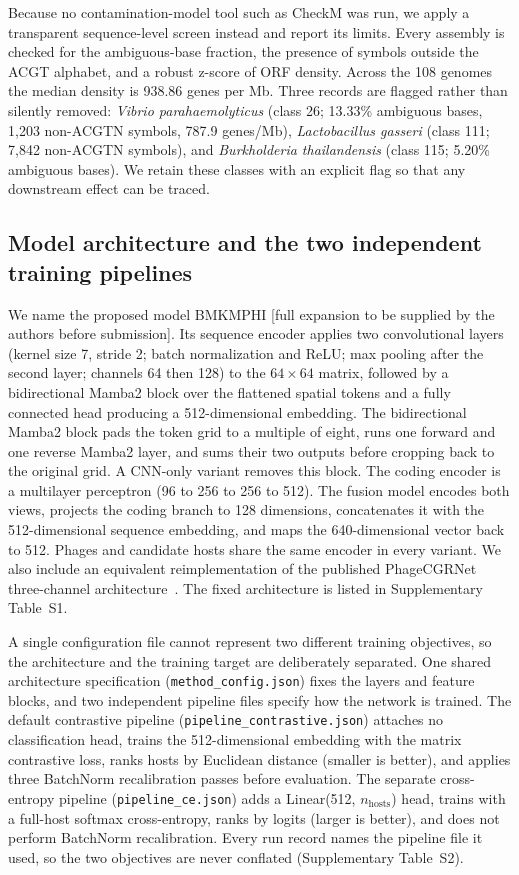 \documentclass[utf8]{FrontiersinVancouver}
\begin{document}
Because no contamination-model tool such as CheckM was run, we apply a transparent sequence-level screen instead and report its limits. Every assembly is checked for the ambiguous-base fraction, the presence of symbols outside the ACGT alphabet, and a robust z-score of ORF density. Across the 108 genomes the median density is 938.86 genes per Mb. Three records are flagged rather than silently removed: \textit{Vibrio parahaemolyticus} (class 26; 13.33\% ambiguous bases, 1,203 non-ACGTN symbols, 787.9 genes/Mb), \textit{Lactobacillus gasseri} (class 111; 7,842 non-ACGTN symbols), and \textit{Burkholderia thailandensis} (class 115; 5.20\% ambiguous bases). We retain these classes with an explicit flag so that any downstream effect can be traced.

\subsection{Model architecture and the two independent training pipelines}

We name the proposed model BMKMPHI [full expansion to be supplied by the authors before submission]. Its sequence encoder applies two convolutional layers (kernel size 7, stride 2; batch normalization and ReLU; max pooling after the second layer; channels 64 then 128) to the $64\times64$ matrix, followed by a bidirectional Mamba2 block over the flattened spatial tokens and a fully connected head producing a 512-dimensional embedding. The bidirectional Mamba2 block pads the token grid to a multiple of eight, runs one forward and one reverse Mamba2 layer, and sums their two outputs before cropping back to the original grid. A CNN-only variant removes this block. The coding encoder is a multilayer perceptron (96 to 256 to 256 to 512). The fusion model encodes both views, projects the coding branch to 128 dimensions, concatenates it with the 512-dimensional sequence embedding, and maps the 640-dimensional vector back to 512. Phages and candidate hosts share the same encoder in every variant. We also include an equivalent reimplementation of the published PhageCGRNet three-channel architecture~\citep{wang2026phagecgrnet}. The fixed architecture is listed in Supplementary Table~S1.

A single configuration file cannot represent two different training objectives, so the architecture and the training target are deliberately separated. One shared architecture specification (\texttt{method\_config.json}) fixes the layers and feature blocks, and two independent pipeline files specify how the network is trained. The default contrastive pipeline (\texttt{pipeline\_contrastive.json}) attaches no classification head, trains the 512-dimensional embedding with the matrix contrastive loss, ranks hosts by Euclidean distance (smaller is better), and applies three BatchNorm recalibration passes before evaluation. The separate cross-entropy pipeline (\texttt{pipeline\_ce.json}) adds a Linear(512, $n_{\text{hosts}}$) head, trains with a full-host softmax cross-entropy, ranks by logits (larger is better), and does not perform BatchNorm recalibration. Every run record names the pipeline file it used, so the two objectives are never conflated (Supplementary Table~S2).
\end{document}
